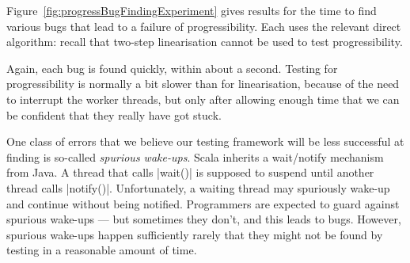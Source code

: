 Figure~\ref{fig:progressBugFindingExperiment} gives results for the time to
find various bugs that lead to a failure of progressibility.  Each uses the
relevant direct algorithm: recall that two-step linearisation cannot be used
to test progressibility. 

Again, each bug is found quickly, within about a second.  Testing for
progressibility is normally a bit slower than for linearisation, because of
the need to interrupt the worker threads, but only after allowing enough time
that we can be confident that they really have got stuck.

One class of errors that we believe our testing framework will be less
successful at finding is so-called \emph{spurious wake-ups}.  Scala inherits a
wait/notify mechanism from Java.  A thread that calls |wait()| is supposed to
suspend until another thread calls |notify()|.  Unfortunately, a waiting
thread may spuriously wake-up and continue without being notified.
Programmers are expected to guard against spurious wake-ups --- but sometimes
they don't, and this leads to bugs.  However, spurious wake-ups happen
sufficiently rarely that they might not be found by testing in a reasonable
amount of time.
